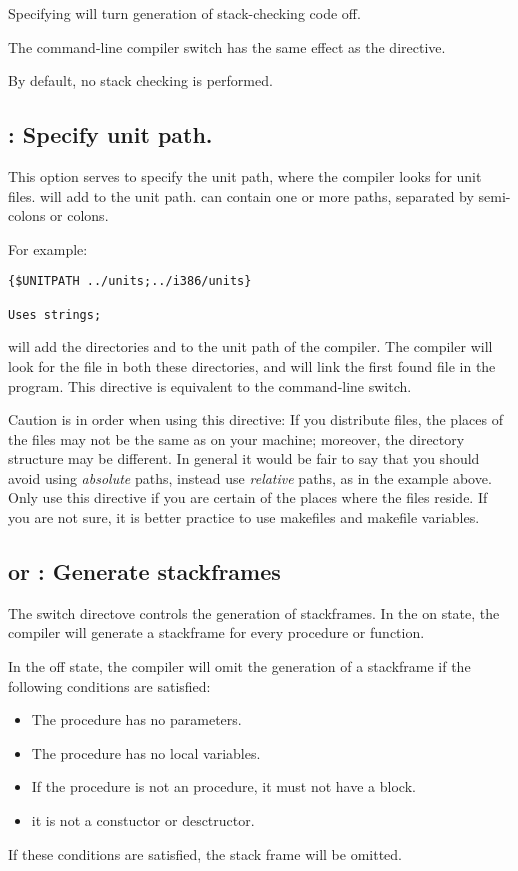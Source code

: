 Specifying  will turn generation of stack-checking code off.

The command-line compiler switch  has the same effect as the
 directive.

By default, no stack checking is performed.

\subsection{ : Specify unit path.}

This option serves to specify the unit path, where the compiler looks for
unit files.  will add  to the unit
path.  can contain one or more paths, separated by semi-colons or
colons.

For example:
\begin{verbatim}
{$UNITPATH ../units;../i386/units}

Uses strings;
\end{verbatim}

will add the directories  and  to the unit
path of the compiler. The compiler will look for the file 
in both these directories, and will link the first found file in the
program. This directive is equivalent to the  command-line switch.

Caution is in order when using this directive: If you distribute files, the
places of the files may not be the same as on your machine; moreover, the
directory structure may be different. In general it would be fair to say
that you should avoid using {\em absolute} paths, instead use {\em relative}
paths, as in the example above. Only use this directive if you are certain
of the places where the files reside. If you are not sure, it is better
practice to use makefiles and makefile variables.

\subsection{ or  : Generate stackframes}

The  switch directove controls the generation of stackframes.
In the on state, the compiler will generate a
stackframe for every procedure or function.

In the off state, the compiler will omit the generation of a stackframe if
the following conditions are satisfied:
\begin{itemize}
\item The procedure has no parameters.
\item The procedure has no local variables.
\item If the procedure is not an  procedure, it must not have
a  block.
\item it is not a constuctor or desctructor.
\end{itemize}
If these conditions are satisfied, the stack frame will be omitted.

